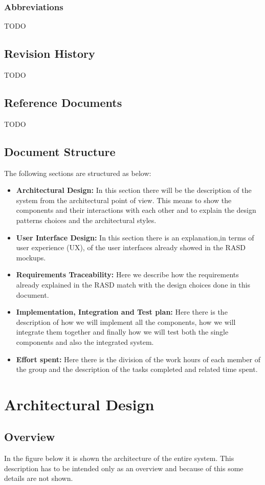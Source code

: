 \documentclass[titlepage]{article}
\begin{document}
\subsubsection{Abbreviations}
TODO
\subsection{Revision History}
TODO
\subsection{Reference Documents}
TODO
\subsection{Document Structure}
The following sections are structured as below:
\begin{itemize}
	\item \textbf{Architectural Design: }In this section there will be the description of the system from the architectural point of view. This means to show the components and their interactions with each other and to explain the design patterns choices and the architectural styles. 
	\item \textbf{User Interface Design:} In this section there is an explanation,in terms of user experience (UX), of the user interfaces already showed in the RASD mockups.
	\item \textbf{Requirements Traceability:} Here we describe how the requirements already explained in the RASD match with the design choices done in this document.
	\item \textbf{Implementation, Integration and Test plan:} Here there is the description of how we will implement all the components, how we will integrate them together and finally how we will test both the single components and also the integrated system.
	\item \textbf{Effort spent:} Here there is the division of the work hours of each member of the group and the description of the tasks completed and related time spent.
\end{itemize}
\section{Architectural Design}
\subsection{Overview}
In the figure below it is shown the architecture of the entire system. This description has to be intended only as an overview and because of this some details are not shown.
\end{document}
